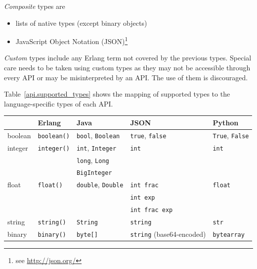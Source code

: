 \documentclass[a4paper]{scrreprt}
\newcommand{\code}[1]{\lstinline[basicstyle=\ttfamily]!#1!}
\begin{document}
\emph{Composite} types are
\begin{itemize}
  \item lists of native types (except binary objects)
  \item JavaScript Object Notation (JSON)\footnote{see \url{http://json.org/}}
\end{itemize}

\emph{Custom} types include any Erlang term not covered by the previous types.
Special care needs to be taken using custom types as they may not be accessible
through every API or may be misinterpreted by an API. The use of them is
discouraged.

Table~\ref{api.supported_types} shows the mapping of supported types to the
language-specific types of each API.

\begin{table}
  \centering
  \begin{threeparttable}[b]
    \begin{tabular}{lllll}
    \toprule
               & Erlang            & Java                         & JSON                            & Python                    \\
    \midrule
    boolean    & \code{boolean()}  & \code{bool}, \code{Boolean}  & \code{true}, \code{false}       & \code{True}, \code{False} \\
    integer    & \code{integer()}  & \code{int}, \code{Integer}   & \code{int}                      & \code{int}                \\
               &                   & \code{long}, \code{Long}     &                                 &                           \\
               &                   & \code{BigInteger}            &                                 &                           \\
    float      & \code{float()}    & \code{double}, \code{Double} & \code{int frac}                 & \code{float}              \\
               &                   &                              & \code{int exp}                  &                           \\
               &                   &                              & \code{int frac exp}             &                           \\
    string     & \code{string()}   & \code{String}                & \code{string}                   & \code{str}                \\
    binary     & \code{binary()}   & \code{byte[]}                & \code{string} (base64-encoded)  & \code{bytearray}          \\

\end{tabular}
\end{threeparttable}
\end{table}
\end{document}
